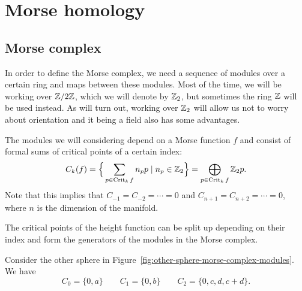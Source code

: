 \chapter{Morse homology}
\label{chap:morse-homology}


\section{Morse complex}
In order to define the Morse complex, we need a sequence of modules over a certain ring and maps between these modules.
Most of the time, we will be working over $\mathbb{Z}/2\mathbb{Z}$, which we will denote by $\mathbb{Z}_2$, but sometimes the ring $\mathbb{Z}$ will be used instead. As will turn out, working over $\mathbb{Z}_2$ will allow us not to worry about orientation and it being a field also has some advantages.

The modules we will considering depend on a Morse function $f$ and consist of formal sums of critical points of a certain index:
\[
    C_k(f) = \Big\{ \sum_{p \in \operatorname{Crit}_k f} n_p p  \mid n_p \in \mathbb{Z}_2\Big\}  = \bigoplus_{p \in \operatorname{Crit}_k f} \mathbb{Z}_2 p
.\] 
Note that this implies that $C_{-1} = C_{-2} = \cdots = 0$ and $C_{n+1} = C_{n+2} = \cdots = 0$, where $n$ is the dimension of the manifold.


\begin{marginfigure}
    \centering
    \caption{The critical points of the height function can be split up depending on their index and form the generators of the modules in the Morse complex.}
    \label{fig:other-sphere-morse-complex-modules}
\end{marginfigure}

\begin{eg}
    Consider the other sphere in Figure~\ref{fig:other-sphere-morse-complex-modules}. We have
    \[
    C_0 = \{0, a\}  \qquad C_1 = \{0, b\}  \qquad C_2 = \{0, c, d, c+d\} 
    .\] 
\end{eg}

